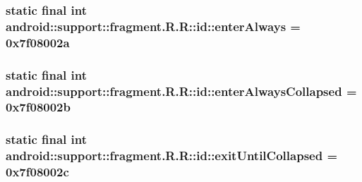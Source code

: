 \hypertarget{classandroid_1_1support_1_1fragment_1_1_r_1_1id_ecb07a14361c722fe3430720b90b2074}{
\subsubsection[{enterAlways}]{\setlength{\rightskip}{0pt plus 5cm}static final int android::support::fragment.R.R::id::enterAlways = 0x7f08002a}}
\label{classandroid_1_1support_1_1fragment_1_1_r_1_1id_ecb07a14361c722fe3430720b90b2074}


\hypertarget{classandroid_1_1support_1_1fragment_1_1_r_1_1id_b4440910ed99eb821bef9e2044d444ee}{
\subsubsection[{enterAlwaysCollapsed}]{\setlength{\rightskip}{0pt plus 5cm}static final int android::support::fragment.R.R::id::enterAlwaysCollapsed = 0x7f08002b}}
\label{classandroid_1_1support_1_1fragment_1_1_r_1_1id_b4440910ed99eb821bef9e2044d444ee}


\hypertarget{classandroid_1_1support_1_1fragment_1_1_r_1_1id_7afde6517186a2921dd8a4f3546e7f6c}{
\subsubsection[{exitUntilCollapsed}]{\setlength{\rightskip}{0pt plus 5cm}static final int android::support::fragment.R.R::id::exitUntilCollapsed = 0x7f08002c}}
\label{classandroid_1_1support_1_1fragment_1_1_r_1_1id_7afde6517186a2921dd8a4f3546e7f6c}


